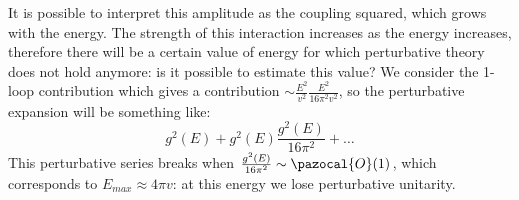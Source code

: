 \documentclass[../main.tex]{subfiles}
\begin{document}
It is possible to interpret this amplitude as the coupling squared, which grows with the energy. The strength of this interaction increases as the energy increases, therefore there will be a certain value of energy for which perturbative theory does not hold anymore: is it possible to estimate this value? We consider the 1-loop contribution  which gives a contribution $\sim\frac{E^2}{v^2}\frac{E^2}{16\pi^2v^2}$, so the perturbative expansion will be something like:
\[
g^2(E)+g^2(E)\frac{g^2(E)}{16\pi^2}+\dots
\]
This perturbative series breaks when $\frac{g^2(E)}{16\pi^2}\sim\pazocal{O}(1)$, which corresponds to $E_{max}\approx4\pi v$: at this energy we lose perturbative unitarity. 
\end{document}

